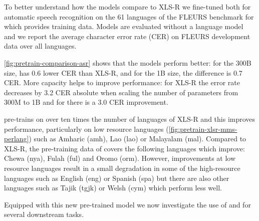 \insertPretrainComparisonASR

To better understand how the {\modelname} models compare to XLS-R we fine-tuned both for automatic speech recognition on the 61 languages of the FLEURS benchmark for which \MMS{} provides training data.
Models are evaluated without a language model and we report the average character error rate (CER) on FLEURS development data over all languages.

\autoref{fig:pretrain-comparison-asr} shows that the {\modelname} models perform better: for the 300B size, {\modelname} has 0.6 lower CER than XLS-R, and for the 1B size, the difference is 0.7 CER.
More capacity helps to improve performance: 
for XLS-R the error rate decreases by 3.2 CER absolute when scaling the number of parameters from 300M to 1B and for \MMS{} there is a 3.0 CER improvement.

\modelname{} pre-trains on over ten times the number of languages of XLS-R and this improves performance, particularly on low resource languages (\autoref{fig:pretrain-xlsr-mms-perlang}) such as Amharic (amh), Lao (lao) or Malayalam (mal).
Compared to XLS-R, the pre-training data of \modelname{} covers the following languages which improve: Chewa (nya), Fulah (ful) and Oromo (orm).
However, improvements at low resource languages result in a small degradation in some of the high-resource languages such as English (eng) or Spanish (spa) but there are also other languages such as Tajik (tgjk) or Welsh (cym) which perform less well.

\insertPretainXLSRvsMMS

Equipped with this new pre-trained model we now investigate the use of \MMS{} and \GRN{} for several downstream tasks.
